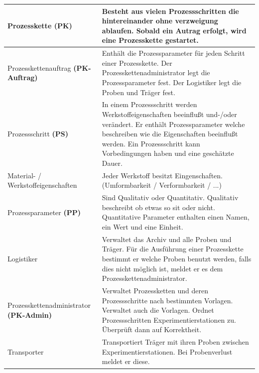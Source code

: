 \documentclass[enabledeprecatedfontcommands,fontsize=12pt,paper=a4,twoside]{scrartcl}
\begin{document}
\begin{longtable}[c]{|p{7cm}|p{8cm}|}
Prozesskette \textbf{(PK)}                       & Besteht aus vielen Prozessschritten die hintereinander ohne verzweigung ablaufen. Sobald ein Autrag erfolgt, wird eine Prozesskette gestartet.                                                                                                        \\ \hline
Prozesskettenauftrag \textbf{(PK-Auftrag)}     & Enthält die Prozessparameter für jeden Schritt einer Prozesskette. Der Prozesskettenadministrator legt die Prozessparameter fest. Der Logistiker legt die Proben und Träger fest.                                                                     \\ \hline
Prozessschritt \textbf{(PS)}                     & In einem Prozessschritt werden Werkstoffeigenschaften beeinflußt und-/oder verändert. Er enthält Prozessparameter welche beschreiben wie die Eigenschaften beeinflußt werden. Ein Prozessschritt kann Vorbedingungen haben und eine geschätzte Dauer. \\ \hline
Material- / Werkstoffeigenschaften                              & Jeder Werkstoff besitzt Eingenschaften. (Umformbarkeit / Verformbarkeit / ...)                                                                                                                                                                        \\ \hline
Prozessparameter \textbf{(PP)}                   & Sind Qualitativ oder Quantitativ. Qualitativ beschreibt ob etwas so sit oder nicht. Quantitative Parameter enthalten einen Namen, ein Wert und eine Einheit.                                                                                          \\ \hline
Logistiker                                                      & Verwaltet das Archiv und alle Proben und Träger. Für die Ausführung einer Prozesskette bestimmt er welche Proben benutzt werden, falls dies nicht möglich ist, meldet er es dem Prozesskettenadministrator.                                           \\ \hline
Prozesskettenadministrator\textbf{ (PK-Admin)} & Verwaltet Prozessketten und deren Prozessschritte nach bestimmten Vorlagen. Verwaltet auch die Vorlagen. Ordnet Prozessschritten Experimentierstationen zu. Überprüft dann auf Korrektheit.                                                           \\ \hline
Transporter                                                     & Transportiert Träger mit ihren Proben zwischen Experimentierstationen. Bei Probenverlust meldet er diese.                                                                                                                                             \\ \hline

\end{longtable}
\end{document}
